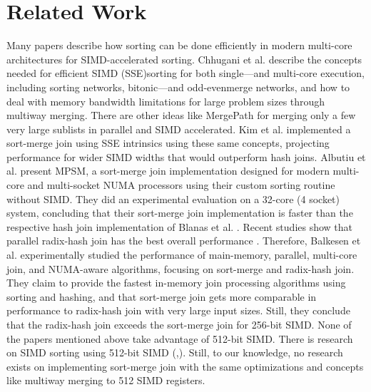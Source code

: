 \section{Related Work}
\label{sec:related-work}


Many papers describe how sorting can be done efficiently in modern multi-core architectures for
SIMD-accelerated sorting. Chhugani et al. \cite{10.14778/1454159.1454171} describe the concepts 
needed for efficient SIMD (SSE)sorting for both single—and multi-core execution, including sorting
networks, bitonic—and odd-evenmerge networks, and how to deal with memory bandwidth limitations 
for large problem sizes through multiway merging. There are other ideas like MergePath \cite{MergePath}
for merging only a few very large sublists in parallel and SIMD accelerated.
Kim et al. \cite{10.14778/1687553.1687564} implemented a sort-merge join using SSE intrinsics using these same 
concepts, projecting performance for wider SIMD widths that would outperform hash joins. Albutiu 
et al. \cite{MPSM} present MPSM, a sort-merge join implementation designed for modern multi-core and
multi-socket NUMA processors using their custom sorting routine without SIMD. They did an
experimental evaluation on a 32-core (4 socket) system, concluding that their sort-merge join
implementation is faster than the respective hash join implementation of Blanas et al. \cite{10.1145/1989323.1989328}. 
Recent studies show that parallel radix-hash join has the best overall performance \cite{6544839}. Therefore,
Balkesen et al. \cite{Balkesen} experimentally studied the performance of main-memory, parallel,
multi-core join, and NUMA-aware algorithms, focusing on sort-merge and radix-hash join.
They claim to provide the fastest in-memory join processing algorithms using sorting and hashing,
and that sort-merge join gets more comparable in performance to radix-hash join with very large 
input sizes. Still, they conclude that the radix-hash join exceeds the sort-merge join for 256-bit
SIMD. None of the papers mentioned above take advantage of 512-bit SIMD. There is research on SIMD
sorting using 512-bit SIMD (\cite{Watkins},\cite{8855628}). Still, to our knowledge, no research
exists on implementing sort-merge join with the same optimizations and concepts like
multiway merging to 512 SIMD registers.

\cite{MergePath} 
